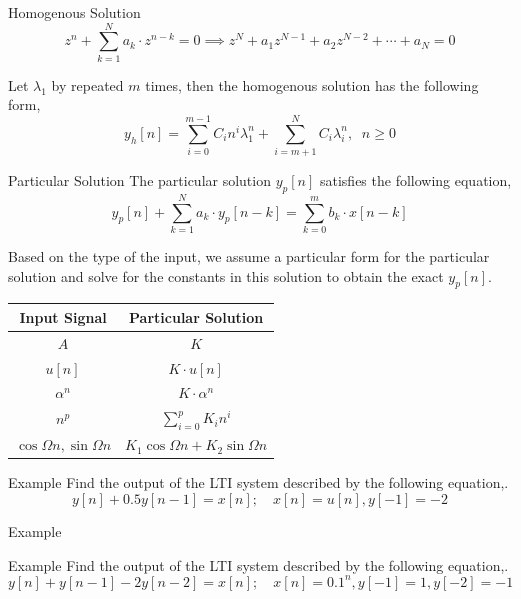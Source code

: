 \documentclass[aspectratio=169]{beamer}
\begin{document}
\begin{frame}[t]{Homogenous Solution}
\[ z^n + \sum_{k=1}^N a_k \cdot z^{n - k} = 0 \implies z^N + a_1z^{N-1} + a_2z^{N-2} + \cdots + a_N = 0 \]

Let $\lambda_1$ by repeated $m$ times, then the homogenous solution has the following form,
\[ y_h[n] = \sum_{i=0}^{m-1} C_i n^i \lambda_1^n + \sum_{i=m+1}^N C_i \lambda_i^n , \,\,\ n \geq 0 \]

\end{frame}


\begin{frame}[t]{Particular Solution}
The particular solution $y_p[n]$ satisfies the following equation,
\[ y_p[n] + \sum_{k=1}^N a_k \cdot y_p[n - k] = \sum_{k=0}^{m} b_k \cdot x[n-k] \]

Based on the type of the input, we assume a particular form for the particular solution and solve for the constants in this solution to obtain the exact $y_p[n]$.

\begin{table}[]
\begin{tabular}{|c|c|}
\hline
Input Signal & Particular Solution \\ \hline
$A$ & $K$ \\ \hline
$u[n]$ & $K\cdot u[n]$\\ \hline
$\alpha^n$ & $K\cdot \alpha^n$\\ \hline
$n^p$ & $\sum_{i=0}^p K_i n^i$\\ \hline
$\cos \Omega n, \sin \Omega n$ & $K_1\cos \Omega n + K_2\sin \Omega n$\\ \hline
\end{tabular}
\end{table}
\end{frame}


\begin{frame}[t]{Example}
Find the output of the LTI system described by the following equation,.
\[ y[n] + 0.5 y[n-1] = x[n]; \quad x[n] = u[n], y[-1] = -2 \]
\end{frame}


\begin{frame}[t]{Example}
\end{frame}


\begin{frame}[t]{Example}
Find the output of the LTI system described by the following equation,.
\[ y[n] + y[n-1] -2 y[n-2] = x[n]; \quad x[n] = 0.1^n, y[-1] = 1, y[-2] = -1 \]
\end{frame}
\end{document}
